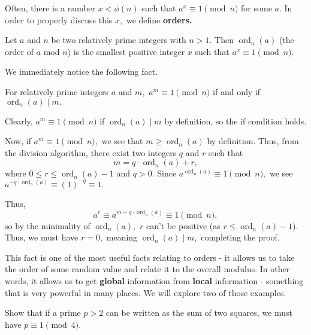 \documentclass[blue,onecol]{shooting}
\begin{document}
Often, there is a number $x < \phi(n)$ such that $a^x \equiv 1 \pmod{n}$ for some $a.$ In order to properly discuss this $x,$ we define \textbf{orders.} 

\begin{defi}[Orders]
Let $a$ and $n$ be two relatively prime integers with $n>1.$ Then $\operatorname{ord}_n(a)$ (the order of $a$ mod $n$) is the smallest positive integer $x$ such that $a^x \equiv 1 \pmod{n}.$
\end{defi}

We immediately notice the following fact.

\begin{fact}
For relatively prime integers $a$ and $m,$ $a^m \equiv 1 \pmod{n}$ if and only if $\operatorname{ord}_n(a) \mid m.$
\end{fact}

\begin{pro}
Clearly, $a^m \equiv 1 \pmod{n}$ if $\operatorname{ord}_n(a) \mid m$ by definition, so the if condition holds.

Now, if $a^m \equiv 1 \pmod{n},$ we see that $m \ge \operatorname{ord}_n(a)$ by definition. Thus, from the division algorithm, there exist two integers $q$ and $r$ such that \[m = q \cdot \operatorname{ord}_n(a)+r,\] where $0 \le r \le \operatorname{ord}_n(a)-1$ and $q>0.$ Since $a^{\operatorname{ord}_n(a)} \equiv 1 \pmod{n},$ we see $a^{-q \cdot \operatorname{ord}_n(a)} \equiv (1)^{-q} \equiv 1.$

Thus, $$a^r \equiv a^{m - q \cdot \operatorname{ord}_n(a)} \equiv 1 \pmod{n},$$ so by the minimality of $\operatorname{ord}_n(a),$ $r$ can't be positive (as $r \le \operatorname{ord}_n(a)-1$). Thus, we must have $r=0,$ meaning $\operatorname{ord}_n(a) \mid m,$ completing the proof.
\end{pro}

This fact is one of the most useful facts relating to orders - it allows us to take the order of some random value and relate it to the overall modulus. In other words, it allows us to get \textbf{global} information from \textbf{local} information - something that is very powerful in many places. We will explore two of those examples.

\begin{exam}
Show that if a prime $p>2$ can be written as the sum of two squares, we must have $p \equiv 1 \pmod{4}.$
\end{exam}
\end{document}
